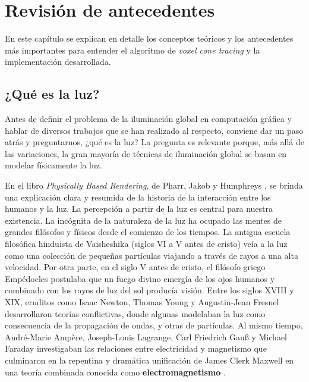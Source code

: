 \graphicspath{{chapters/2_antecedentes/figures/}}

\chapter{Revisión de antecedentes}


En este capítulo se explican en detalle los conceptos teóricos y los antecedentes más importantes para entender el algoritmo de \textit{voxel cone tracing} y la implementación desarrollada.

\section{¿Qué es la luz?}

Antes de definir el problema de la iluminación global en computación gráfica y hablar de diversos trabajos que se han realizado al respecto, conviene dar un paso atrás y preguntarnos, ¿qué es la luz?
La pregunta es relevante porque, más allá de las variaciones, la gran mayoría de técnicas de iluminación global se basan en modelar físicamente la luz.

En el libro \textit{Physically Based Rendering}, de Pharr, Jakob y Humphreys \cite[p.~177]{pbr}, se brinda una explicación clara y resumida de la historia de la interacción entre los humanos y la luz.
La percepción a partir de la luz es central para nuestra existencia.
La incógnita de la naturaleza de la luz ha ocupado las mentes de grandes filósofos y físicos desde el comienzo de los tiempos.
La antigua escuela filosófica hinduista de Vaisheshika (siglos VI a V antes de cristo) veía a la luz como una colección de pequeñas partículas viajando a través de rayos a una alta velocidad.
Por otra parte, en el siglo V antes de cristo, el filósofo griego Empédocles postulaba que un fuego divino emergía de los ojos humanos y combinado con los rayos de luz del sol producía visión.
Entre los siglos XVIII y XIX, eruditos como Isaac Newton, Thomas Young y Augustin-Jean Fresnel desarrollaron teorías conflictivas, donde algunas modelaban la luz como consecuencia de la propagación de ondas, y otras de partículas.
Al mismo tiempo, André-Marie Ampère, Joseph-Louis Lagrange, Carl Friedrich Gauß y Michael Faraday investigaban las relaciones entre electricidad y magnetismo que culminaron en la repentina y dramática unificación de James Clerk Maxwell en una teoría combinada conocida como \textbf{electromagnetismo} \cite{maxwell-equations}.

